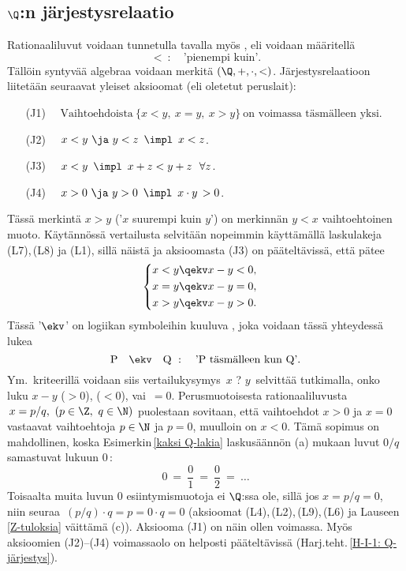 \subsection*{$\Q$:n järjestysrelaatio}
%

Rationaaliluvut voidaan tunnetulla tavalla myös , eli voidaan määritellä
\[
<\ : \quad \text{'pienempi kuin'}.
\]
Tällöin syntyvää algebraa voidaan merkitä $(\Q,+,\cdot,<)$. Järjestysrelaatioon liitetään
seuraavat yleiset aksioomat (eli oletetut peruslait):

\pagebreak

\begin{itemize}
\item[(J1)] $\quad \text{Vaihtoehdoista}\ \{x<y,\ x=y,\ x>y\}\ 
                                          \text{on voimassa täsmälleen yksi}.$
\item[(J2)] $\quad x<y\ \ja\ y<z \,\ \impl\,\ x<z$.
\item[(J3)] $\quad x<y \,\ \impl\,\ x+z < y+z \ \ \forall z$.
\item[(J4)] $\quad x > 0 \ \ja\ y > 0 \,\ \impl\,\ x \cdot y\, > 0$.
\end{itemize}
Tässä merkintä $x>y$ ('$x$ suurempi kuin $y$') on merkinnän $y<x$ vaihtoehtoinen muoto.
Käytännössä vertailusta selvitään nopeimmin käyttämällä laskulakeja (L7),\,(L8) ja (L1), sillä
näistä ja aksioomasta (J3) on pääteltävissä, että pätee
\[ 
\begin{cases} \begin{aligned}
x<y &\qekv x-y < 0, \\ x=y &\qekv x-y = 0, \\ x>y &\qekv x-y > 0.
\end{aligned} \end{cases}
\] 
Tässä '$\ekv$' on logiikan symboleihin kuuluva
, joka voidaan tässä 
yhteydessä lukea
\[
\text{P} \quad \ekv \quad \text{Q}\ : \quad \text{'P täsmälleen kun Q'}.
\]
Ym.\ kriteerillä voidaan siis vertailukysymys $\,x$ ? $y\,$ selvittää tutkimalla, onko luku 
$x-y$ \kor{positiivinen} ($>0$), \kor{negatiivinen} ($<0$), vai $\,=0$. Perusmuotoisesta
rationaaliluvusta $\,x = p/q,\ (p\in\Z,\ q\in \N)$ puolestaan sovitaan, että vaihtoehdot
$x>0$ ja $x=0$ vastaavat vaihtoehtoja $p\in\N$ ja $p=0$, muulloin on $x<0$. Tämä sopimus on
mahdollinen, koska Esimerkin\,\ref{kaksi Q-lakia} laskusäännön (a) mukaan luvut $0/q$ samastuvat
lukuun $0$\,:
\[
0\ =\ \dfrac{0}{1}\ =\ \dfrac{0}{2}\ =\ \ldots
\]
Toisaalta muita luvun $0$ esiintymismuotoja ei $\Q$:ssa ole, sillä jos $x=p/q=0$, niin seuraa
$\,(p/q) \cdot q = p = 0 \cdot q = 0$ (aksioomat (L4),\,(L2),\,(L9),\,(L6) ja Lauseen
\ref{Z-tuloksia} väittämä (c)). Aksiooma (J1) on näin ollen voimassa. Myös aksioomien (J2)--(J4)
voimassaolo on helposti pääteltävissä (Harj.teht.\,\ref{H-I-1: Q-järjestys}).

